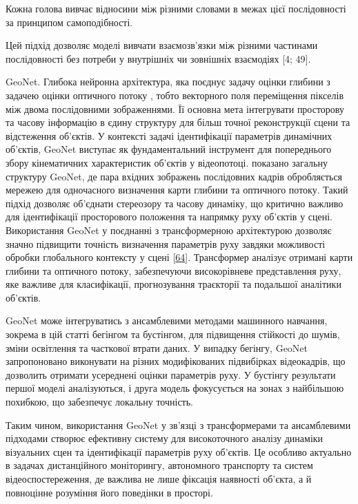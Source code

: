 \documentclass[
]{article}
\begin{document}
Кожна голова вивчає відносини між різними словами в межах цієї послідовності за принципом самоподібності.

Цей підхід дозволяє моделі вивчати взаємозв'язки між різними частинами послідовності без потреби у внутрішніх чи зовнішніх взаємодіях {[}4; 49{]}.

GeoNet. Глибока нейронна архітектура, яка поєднує задачу оцінки глибини з задачею оцінки оптичного потоку , тобто векторного поля переміщення пікселів між двома послідовними зображеннями. Її основна мета інтегрувати просторову та часову інформацію в єдину структуру для більш точної реконструкції сцени та відстеження об'єктів. У контексті задачі ідентифікації параметрів динамічних об'єктів, GeoNet виступає як фундаментальний інструмент для попереднього збору кінематичних характеристик об'єктів у відеопотоці. показано загальну структуру GeoNet, де пара вхідних зображень послідовних кадрів обробляється мережею для одночасного визначення карти глибини та оптичного потоку. Такий підхід дозволяє об'єднати стереозору та часову динаміку, що критично важливо для ідентифікації просторового положення та напрямку руху об'єктів у сцені. Використання GeoNet у поєднанні з трансформерною архітектурою дозволяє значно підвищити точність визначення параметрів руху завдяки можливості обробки глобального контексту у сцені {[}\hyperref[_Ref221389746]{64}{]}. Трансформер аналізує отримані карти глибини та оптичного потоку, забезпечуючи високорівневе представлення руху, яке важливе для класифікації, прогнозування траєкторії та подальшої аналітики об'єктів.

GeoNet може інтегруватись з ансамблевими методами машинного навчання, зокрема в цій статті бегінгом та бустінгом, для підвищення стійкості до шумів, зміни освітлення та часткової втрати даних. У випадку бегінгу, GeoNet запропоновано виконувати на різних модифікованих підвибірках відеокадрів, що дозволить отримати усереднені оцінки параметрів руху. У бустінгу результати першої моделі аналізуються, і друга модель фокусується на зонах з найбільшою похибкою, що забезпечує локальну точність.

Таким чином, використання GeoNet у зв'язці з трансформерами та ансамблевими підходами створює ефективну систему для високоточного аналізу динаміки візуальних сцен та ідентифікації параметрів руху об'єктів. Це особливо актуально в задачах дистанційного моніторингу, автономного транспорту та систем відеоспостереження, де важлива не лише фіксація наявності об'єкта, а й повноцінне розуміння його поведінки в просторі.
\end{document}

